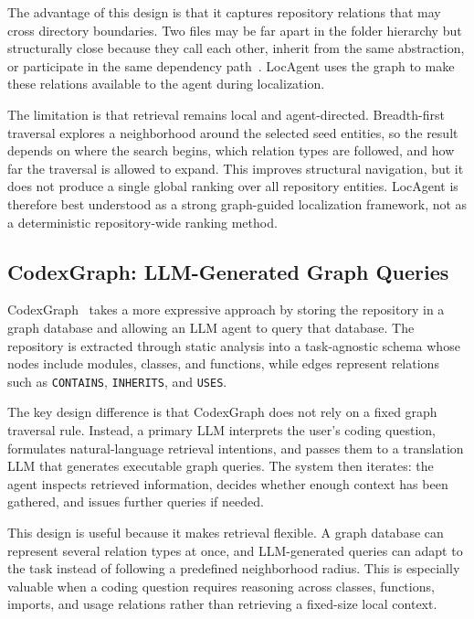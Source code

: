 The advantage of this design is that it captures repository relations that may cross directory boundaries. Two files may be far apart in the folder hierarchy but structurally close because they call each other, inherit from the same abstraction, or participate in the same dependency path~\cite{chen2025locagent}. LocAgent uses the graph to make these relations available to the agent during localization.

The limitation is that retrieval remains local and agent-directed. Breadth-first traversal explores a neighborhood around the selected seed entities, so the result depends on where the search begins, which relation types are followed, and how far the traversal is allowed to expand. This improves structural navigation, but it does not produce a single global ranking over all repository entities. LocAgent is therefore best understood as a strong graph-guided localization framework, not as a deterministic repository-wide ranking method.

\subsection{CodexGraph: LLM-Generated Graph Queries}
\label{sec:codexgraph}

CodexGraph~\cite{liu2024codexgraph} takes a more expressive approach by storing the repository in a graph database and allowing an LLM agent to query that database. The repository is extracted through static analysis into a task-agnostic schema whose nodes include modules, classes, and functions, while edges represent relations such as \texttt{CONTAINS}, \texttt{INHERITS}, and \texttt{USES}.

The key design difference is that CodexGraph does not rely on a fixed graph traversal rule. Instead, a primary LLM interprets the user's coding question, formulates natural-language retrieval intentions, and passes them to a translation LLM that generates executable graph queries. The system then iterates: the agent inspects retrieved information, decides whether enough context has been gathered, and issues further queries if needed.

This design is useful because it makes retrieval flexible. A graph database can represent several relation types at once, and LLM-generated queries can adapt to the task instead of following a predefined neighborhood radius. This is especially valuable when a coding question requires reasoning across classes, functions, imports, and usage relations rather than retrieving a fixed-size local context.

